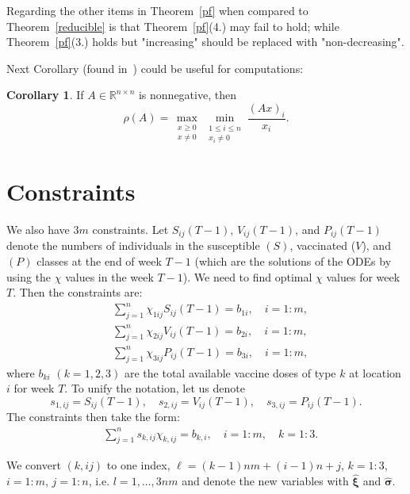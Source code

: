 \documentclass[12pt]{amsart}
\theoremstyle{definition}
\newtheorem{corollary}[theorem]{Corollary}
\begin{document}
Regarding the other items in Theorem~\ref{pf} when compared to Theorem~\ref{reducible} is that Theorem~\ref{pf}(4.) may fail to hold; while Theorem~\ref{pf}(3.) holds but "increasing" should be replaced with "non-decreasing".

Next Corollary (found in~\cite[Corollary~8.3.3]{1985Horn_Johnson}) could be useful for computations:

\begin{corollary}
If $A\in\mathbb{R}^{n\times n}$ is nonnegative, then
\begin{equation}\label{max-min}
\rho(A) = \max_{\substack{x\ge 0 \\ x\neq 0}} 
\min_{\substack{1 \leq i  \leq n \\ x_i\neq 0}} \frac{(A x)_i}{x_i}.
\end{equation}
\end{corollary}
\section{Constraints}
We also have $3m$ constraints. Let $S_{ij}(T-1)$, $V_{ij}(T-1)$, and 
$P_{ij}(T-1)$ denote the numbers of individuals in the susceptible $(S)$, vaccinated ($V$), and $(P)$ classes {\color{red} at the end of week $T-1$} (which are the solutions of the ODEs by using the $\chi$ values in the week $T-1$). We need to find optimal $\chi$ values for week $T$. Then the constraints are:
\begin{equation}\label{eq:c}
\begin{aligned}
&\sum_{j=1}^n \chi_{1ij} S_{ij}(T-1) = b_{1i}, \quad i=1:m, \\
&\sum_{j=1}^n \chi_{2ij} V_{ij}(T-1) = b_{2i}, \quad i=1:m, \\
&\sum_{j=1}^n \chi_{3ij} P_{ij}(T-1) = b_{3i}, \quad i=1:m, 
\end{aligned}
\end{equation}
where $b_{ki}$ $(k=1, 2, 3)$ are the total available vaccine doses of type $k$ at location $i$ for week $T$. To unify the notation, let us denote 
\[
s_{1,ij}=S_{ij}(T-1), \quad 
s_{2,ij}=V_{ij}(T-1),\quad
s_{3,ij}=P_{ij}(T-1).
\]
The constraints then take the form:
\begin{equation}\label{eq:c-1}
\begin{aligned}
&\sum_{j=1}^n s_{k,ij}\chi_{k,ij} = b_{k,i}, \quad i=1:m, \quad k=1:3.
\end{aligned}
\end{equation}

We convert $(k,ij)$ to one index, $\ell=(k-1)nm+(i-1)n+j$, $k=1:3$, $i=1:m$, $j=1:n$, i.e. 
$l=1, \ldots, 3nm$ and denote the new variables with $\widehat{\bm{\xi}}$ and $\widehat{\bm{\sigma}}$.
\end{document}
